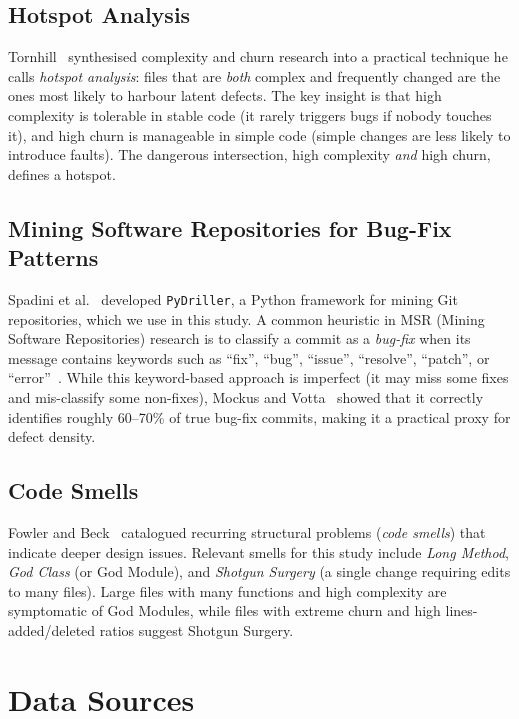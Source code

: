 \documentclass[12pt,a4paper]{article}
\begin{document}
\subsection{Hotspot Analysis}

Tornhill~\cite{tornhill2015} synthesised complexity and churn research into a practical technique he calls \emph{hotspot analysis}: files that are \emph{both} complex and frequently changed are the ones most likely to harbour latent defects.
The key insight is that high complexity is tolerable in stable code (it rarely triggers bugs if nobody touches it), and high churn is manageable in simple code (simple changes are less likely to introduce faults).
The dangerous intersection, high complexity \emph{and} high churn, defines a hotspot.

\subsection{Mining Software Repositories for Bug-Fix Patterns}

Spadini et al.~\cite{spadini2018} developed \texttt{PyDriller}, a Python framework for mining Git repositories, which we use in this study.
A common heuristic in MSR (Mining Software Repositories) research is to classify a commit as a \emph{bug-fix} when its message contains keywords such as ``fix'', ``bug'', ``issue'', ``resolve'', ``patch'', or ``error''~\cite{mockus2000}.
While this keyword-based approach is imperfect (it may miss some fixes and mis-classify some non-fixes), Mockus and Votta~\cite{mockus2000} showed that it correctly identifies roughly 60--70\% of true bug-fix commits, making it a practical proxy for defect density.

\subsection{Code Smells}

Fowler and Beck~\cite{fowlerbeck1999} catalogued recurring structural problems (\emph{code smells}) that indicate deeper design issues.
Relevant smells for this study include \emph{Long Method}, \emph{God Class} (or God Module), and \emph{Shotgun Surgery} (a single change requiring edits to many files).
Large files with many functions and high complexity are symptomatic of God Modules, while files with extreme churn and high lines-added/deleted ratios suggest Shotgun Surgery.

\section{Data Sources}
\label{sec:data}
\end{document}
